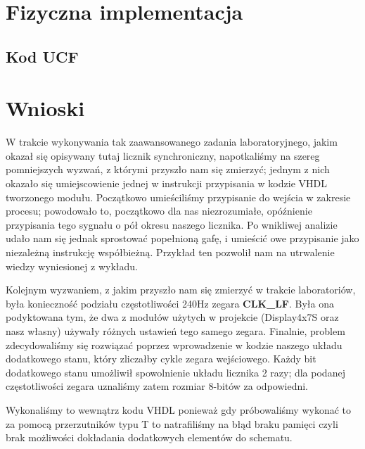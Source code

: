 \documentclass[a4paper,12pt]{extarticle}  %
\begin{document}
\section{Fizyczna implementacja}
\subsection{Kod UCF}



\section{Wnioski}


W trakcie wykonywania tak zaawansowanego zadania laboratoryjnego, jakim okazał się opisywany tutaj licznik synchroniczny, napotkaliśmy na szereg pomniejszych wyzwań, z którymi przyszło nam się zmierzyć; jednym z nich okazało się umiejscowienie jednej w instrukcji przypisania w kodzie VHDL tworzonego modułu. Początkowo umieściliśmy przypisanie do wejścia w zakresie procesu; powodowało to, początkowo dla nas niezrozumiałe, opóźnienie przypisania tego sygnału o pół okresu naszego licznika. Po wnikliwej analizie udało nam się jednak sprostować popełnioną gafę, i umieścić owe przypisanie jako niezależną instrukcję współbieżną. Przykład ten pozwolił nam na utrwalenie wiedzy wyniesionej z wykładu.

Kolejnym wyzwaniem, z jakim przyszło nam się zmierzyć w trakcie laboratoriów, była konieczność podziału częstotliwości 240Hz zegara \textbf{CLK\_LF}. Była ona podyktowana tym, że dwa z modułów użytych w projekcie (Display4x7S oraz nasz własny) używały różnych ustawień tego samego zegara. %
Finalnie, problem zdecydowaliśmy się rozwiązać poprzez wprowadzenie w kodzie naszego układu dodatkowego stanu, który zliczałby cykle zegara wejściowego. Każdy bit dodatkowego stanu umożliwił spowolnienie układu licznika 2 razy; dla podanej częstotliwości zegara uznaliśmy zatem rozmiar 8-bitów za odpowiedni.

Wykonaliśmy to wewnątrz kodu VHDL ponieważ gdy próbowaliśmy wykonać to za pomocą przerzutników typu T to natrafiliśmy na błąd braku pamięci czyli brak możliwości dokładania dodatkowych elementów do schematu.
\end{document}
